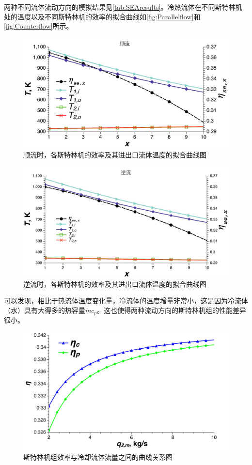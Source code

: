 两种不同流体流动方向的模拟结果见\autoref{tab:SEAresults}。冷热流体在不同斯特林机处的温度以及不同斯特林机的效率的拟合曲线如\autoref{fig:Parallelflow}和\autoref{fig:Counterflow}所示。

\begin{figure}[ht!]
\centering
	\includegraphics[width = 0.8\columnwidth]{fig/Parallelflow.pdf}
	\caption{顺流时，各斯特林机的效率及其进出口流体温度的拟合曲线图}
	\label{fig:Parallelflow}
\end{figure}

\begin{figure}[ht!]
\centering
	\includegraphics[width = 0.8\columnwidth]{fig/Counterflow.pdf}
	\caption{逆流时，各斯特林机的效率及其进出口流体温度的拟合曲线图}
	\label{fig:Counterflow}
\end{figure}

可以发现，相比于热流体温度变化量，冷流体的温度增量非常小，这是因为冷流体（水）具有大得多的热容量$\dot{m}c_p$。这也使得两种流动方向的斯特林机组的性能差异很小。

\begin{figure}[htbp]
\centering
	\includegraphics[width = 0.8\columnwidth, angle = 0]{fig/SEAflowtypes}
	\caption{斯特林机组效率与冷却流体流量之间的曲线关系图}
	\label{fig:SEAflowtypes}
\end{figure}


